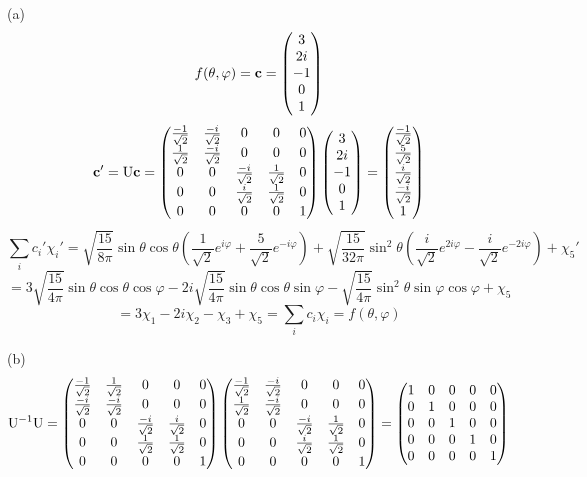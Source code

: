 \documentclass[a4paper]{article}
\begin{document}
(a) 
\renewcommand{\arraystretch}{1}
\[
f(\theta,\varphi)=\mathbf{c}=
\begin{pmatrix}
3\\2i\\-1\\0\\1
\end{pmatrix}
\]
\renewcommand{\arraystretch}{1.5}
\[
\mathbf{c'}=\mathrm{U}\mathbf{c}=
\begin{pmatrix}
\frac{-1}{\sqrt{2}}&\frac{-i}{\sqrt{2}}&0&0&0\\
\frac{1}{\sqrt{2}}&\frac{-i}{\sqrt{2}}&0&0&0\\
0&0&\frac{-i}{\sqrt{2}}&\frac{1}{\sqrt{2}}&0\\
0&0&\frac{i}{\sqrt{2}}&\frac{1}{\sqrt{2}}&0\\
0&0&0&0&1
\end{pmatrix}
\begin{pmatrix}
3\\2i\\-1\\0\\1
\end{pmatrix}=
\begin{pmatrix}
\frac{-1}{\sqrt{2}}\\\frac{5}{\sqrt{2}}\\\frac{i}{\sqrt{2}}\\\frac{-i}{\sqrt{2}}\\1
\end{pmatrix}
\]
\[
\sum_ic_i'\chi_i'=\sqrt{\frac{15}{8\pi}}\sin\theta\cos\theta(\frac{1}{\sqrt{2}}e^{i\varphi}+\frac{5}{\sqrt{2}}e^{-i\varphi})+\sqrt{\frac{15}{32\pi}}\sin^2\theta(\frac{i}{\sqrt{2}}e^{2i\varphi}-\frac{i}{\sqrt{2}}e^{-2i\varphi})+\chi_5'
\]
\[
=3\sqrt{\frac{15}{4\pi}}\sin\theta\cos\theta\cos\varphi-2i\sqrt{\frac{15}{4\pi}}\sin\theta\cos\theta\sin\varphi-\sqrt{\frac{15}{4\pi}}\sin^2\theta\sin\varphi\cos\varphi+\chi_5
\]
\[
=3\chi_1-2i\chi_2-\chi_3+\chi_5=\sum_ic_i\chi_i=f(\theta,\varphi)
\]

(b)
\[
\mathrm{U}^{-1}\mathrm{U}=
\begin{pmatrix}
\frac{-1}{\sqrt{2}}&\frac{1}{\sqrt{2}}&0&0&0\\
\frac{-i}{\sqrt{2}}&\frac{-i}{\sqrt{2}}&0&0&0\\
0&0&\frac{-i}{\sqrt{2}}&\frac{i}{\sqrt{2}}&0\\
0&0&\frac{1}{\sqrt{2}}&\frac{1}{\sqrt{2}}&0\\
0&0&0&0&1
\end{pmatrix}
\begin{pmatrix}
\frac{-1}{\sqrt{2}}&\frac{-i}{\sqrt{2}}&0&0&0\\
\frac{1}{\sqrt{2}}&\frac{-i}{\sqrt{2}}&0&0&0\\
0&0&\frac{-i}{\sqrt{2}}&\frac{1}{\sqrt{2}}&0\\
0&0&\frac{i}{\sqrt{2}}&\frac{1}{\sqrt{2}}&0\\
0&0&0&0&1
\end{pmatrix}=
\begin{pmatrix}
1&0&0&0&0\\
0&1&0&0&0\\
0&0&1&0&0\\
0&0&0&1 &0\\
0&0&0&0&1
\end{pmatrix}
\]
\end{document}
